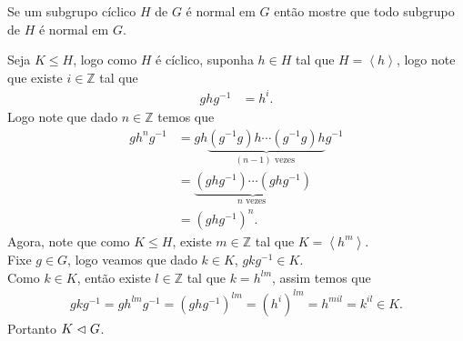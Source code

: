 \begin{homeworkProblem}
  Se um subgrupo cíclico $H$ de $G$ é normal em $G$ então mostre que todo subgrupo de $H$ é normal em $G$.
  \begin{solution}
    Seja $K\leq H$, logo como $H$ é cíclico, suponha $h\in H$ tal que $H=\left\langle h \right\rangle$, logo note que existe $i\in\mathbb{Z}$ tal que 
    \begin{align*}
      ghg^{-1}&=h^{i}.
    \end{align*}
    Logo note que dado $n\in \mathbb{Z}$ temos que
    \begin{align*}
      gh^{n}g^{-1}&=gh\underbrace{(g^{-1}g)h\cdots (g^{-1}g)h}_{(n-1)\text{ vezes }}g^{-1}\\
      &=\underbrace{(ghg^{-1})\cdots (ghg^{-1})}_{n\text{ vezes }}\\
      &=(ghg^{-1})^{n}.
    \end{align*}
    Agora, note que como $K\leq H$, existe $m\in\mathbb{Z}$ tal que $K=\left\langle h^{m} \right\rangle$.\\
    Fixe $g\in G$, logo veamos que dado $k\in K$, $gkg^{-1}\in K$.\\
    Como $k\in K$, então existe $l\in \mathbb{Z}$ tal que $k=h^{lm}$, assim temos que
    \begin{align*}
      gkg^{-1}=gh^{lm}g^{-1}
      =(ghg^{-1})^{lm}
      =(h^{i})^{lm}
      =h^{mil}
      =k^{il}\in K.
    \end{align*}
    Portanto $K\vartriangleleft G$.
  \end{solution}
\end{homeworkProblem}

